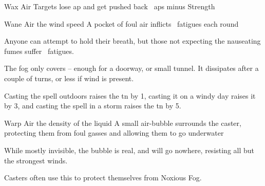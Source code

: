   {}%
  {Wax}%
  {Air}%
  {}%
  {Targets lose  \gls{ap} and get pushed back ~\glspl{ap} minus Strength}%
  {}

  {}%
  {Wane}%
  {Air}%
  {the wind speed}%
  {A pocket of foul air inflicts ~\glspl{fatigue} each round}%
  {
    Anyone can attempt to hold their breath, but those not expecting the nauseating fumes suffer ~\glspl{fatigue}.

    The fog only covers  -- enough for a doorway, or small tunnel.
    It dissipates after a couple of turns, or less if wind is present.

    Casting the spell outdoors raises the \gls{tn} by 1, casting it on a windy day raises it by 3, and casting the spell in a storm raises the \gls{tn} by 5.
  }

  {}%
  {Warp}%
  {Air}%
  {the density of the liquid}%
  {A small air-bubble surrounds the caster, protecting them from foul gasses and allowing them to go underwater}%
  {
    While mostly invisible, the bubble is real, and will go nowhere, resisting all but the strongest winds.

    Casters often use this to protect themselves from Noxious Fog.
  }

